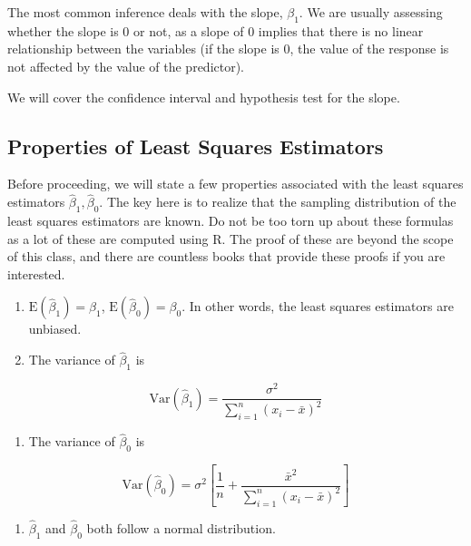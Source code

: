 \documentclass[
]{book}
\providecommand{\tightlist}{%
  \setlength{\itemsep}{0pt}\setlength{\parskip}{0pt}}
\begin{document}
The most common inference deals with the slope, \(\beta_1\). We are usually assessing whether the slope is 0 or not, as a slope of 0 implies that there is no linear relationship between the variables (if the slope is 0, the value of the response is not affected by the value of the predictor).

We will cover the confidence interval and hypothesis test for the slope.

\subsection{Properties of Least Squares Estimators}\label{properties-of-least-squares-estimators}

Before proceeding, we will state a few properties associated with the least squares estimators \(\hat{\beta}_1, \hat{\beta}_0\). The key here is to realize that the sampling distribution of the least squares estimators are known. Do not be too torn up about these formulas as a lot of these are computed using R. The proof of these are beyond the scope of this class, and there are countless books that provide these proofs if you are interested.

\begin{enumerate}
\def\labelenumi{\arabic{enumi}.}
\item
  \(\mbox{E}(\hat{\beta}_1) = \beta_1\), \(\mbox{E}(\hat{\beta}_0) = \beta_0\). In other words, the least squares estimators are unbiased.
\item
  The variance of \(\hat{\beta}_1\) is
\end{enumerate}

\begin{equation} 
\mbox{Var}(\hat{\beta}_1) = \frac{\sigma^{2}}{\sum_{i=1}^n{(x_{i}-\bar{x})^{2}}}
\label{eq:10-varb1}
\end{equation}

\begin{enumerate}
\def\labelenumi{\arabic{enumi}.}
\setcounter{enumi}{2}
\tightlist
\item
  The variance of \(\hat{\beta}_0\) is
\end{enumerate}

\begin{equation} 
\mbox{Var}(\hat{\beta}_0) = \sigma^2 \left[\frac{1}{n} + \frac{\bar{x}^2}{\sum_{i=1}^n (x_i -\bar{x})^2}\right]
\label{eq:10-varb0}
\end{equation}

\begin{enumerate}
\def\labelenumi{\arabic{enumi}.}
\setcounter{enumi}{3}
\tightlist
\item
  \(\hat{\beta}_1\) and \(\hat{\beta}_0\) both follow a normal distribution.
\end{enumerate}
\end{document}
